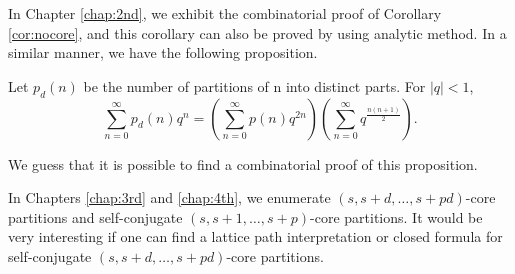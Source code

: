 \appendix



In Chapter \ref{chap:2nd}, we exhibit the combinatorial proof of Corollary \ref{cor:nocore}, and this corollary can also be proved by using analytic method. In a similar manner, we have the following proposition.

\begin{sprop}
Let $p_d(n)$ be the number of partitions of n into distinct parts. For $|q|<1$,
$$\sum_{n=0}^{\infty}  p_d(n) q^n =\left(\sum_{n=0}^{\infty} p(n) q^{2n}\right) \left(\sum_{n=0}^{\infty} q^{\frac{n(n+1)}{2}}\right).$$
\end{sprop}

\vspace{3mm}
We guess that it is possible to find a combinatorial proof of this proposition.

\vspace{3mm}
In Chapters \ref{chap:3rd} and \ref{chap:4th}, we enumerate $(s,s+d,\dots,s+pd)$-core partitions and self-conjugate $(s,s+1,\dots,s+p)$-core partitions. It would be very interesting if one can find a lattice path interpretation or closed formula for self-conjugate $(s,s+d,\dots,s+pd)$-core partitions.
